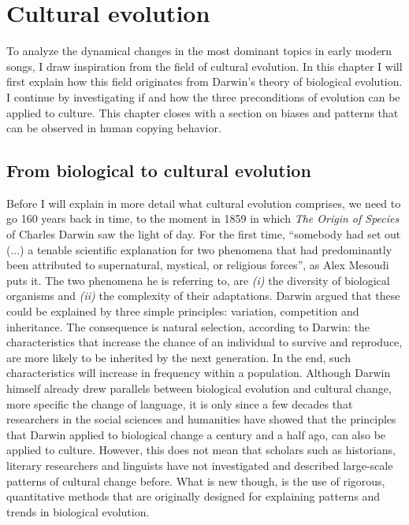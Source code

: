 \chapter{Cultural evolution}
To analyze the dynamical changes in the most dominant topics in early modern songs, I draw inspiration from the field of cultural evolution. In this chapter I will first explain how this field originates from Darwin's theory of biological evolution. I continue by investigating if and how the three preconditions of evolution can be applied to culture. This chapter closes with a section on biases and patterns that can be observed in human copying behavior.

\section{From biological to cultural evolution}
Before I will explain in more detail what cultural evolution comprises, we need to go 160 years back in time, to the moment in 1859 in which \textit{The Origin of Species} of Charles Darwin saw the light of day. For the first time, \enquote{somebody had set out (...) a tenable scientific explanation for two phenomena that had predominantly been attributed to supernatural, mystical, or religious forces}, as Alex Mesoudi puts it.\autocite[vii]{mesoudi_cultural_2011} The two phenomena he is referring to, are \textit{(i)} the diversity of biological organisms and \textit{(ii)} the complexity of their adaptations. Darwin argued that these could be explained by three simple principles: variation, competition and inheritance.\autocite{darwin_origin_1979} The consequence is natural selection, according to Darwin: the characteristics that increase the chance of an individual to survive and reproduce, are more likely to be inherited by the next generation. In the end, such characteristics will increase in frequency within a population.\autocite[viii]{mesoudi_cultural_2011} Although Darwin himself already drew parallels between biological evolution and cultural change, more specific the change of language, it is only since a few decades that researchers in the social sciences and humanities have showed that the principles that Darwin applied to biological change a century and a half ago, can also be applied to culture. However, this does not mean that scholars such as historians, literary researchers and linguists have not investigated and described large-scale patterns of cultural change before. What is new though, is the use of rigorous, quantitative methods that are originally designed for explaining patterns and trends in biological evolution.

